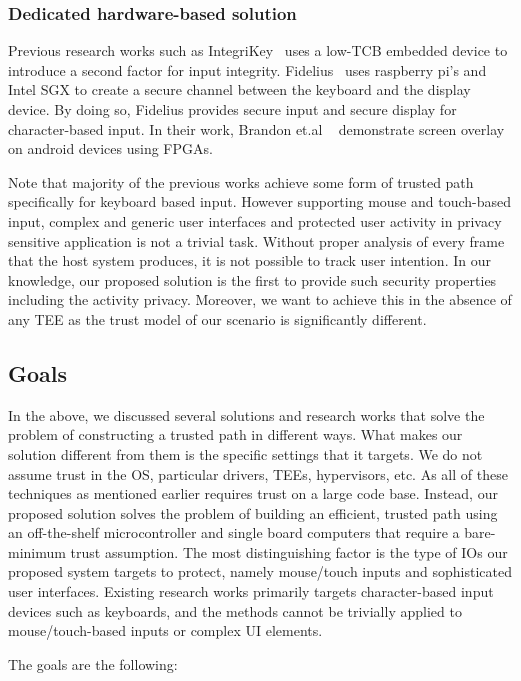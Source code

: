 \subsubsection{Dedicated hardware-based solution} Previous research works such as IntegriKey~\cite{IntegriKey} uses a low-TCB embedded device to introduce a second factor for input integrity. Fidelius~\cite{Fidelius} uses raspberry pi's and Intel SGX to create a secure channel between the keyboard and the display device. By doing so, Fidelius provides secure input and secure display for character-based input. In their work, Brandon et.al ~\cite{brandon2017trusted} demonstrate screen overlay on android devices using FPGAs.

Note that majority of the previous works achieve some form of trusted path specifically for keyboard based input. However supporting mouse and touch-based input, complex and generic user interfaces and protected user activity in privacy sensitive application is not a trivial task. Without proper analysis of every frame that the host system produces, it is not possible to track user intention. In our knowledge, our proposed solution is the first to provide such security properties including the activity privacy. Moreover, we want to achieve this in the absence of any TEE as the trust model of our scenario is significantly different. 


\subsection{Goals}

In the above, we discussed several solutions and research works that solve the problem of constructing a trusted path in different ways. What makes our solution different from them is the specific settings that it targets. We do not assume trust in the OS, particular drivers, TEEs, hypervisors, etc. As all of these techniques as mentioned earlier requires trust on a large code base. Instead, our proposed solution solves the problem of building an efficient, trusted path using an off-the-shelf microcontroller and single board computers that require a bare-minimum trust assumption. The most distinguishing factor is the type of IOs our proposed system targets to protect, namely mouse/touch inputs and sophisticated user interfaces. Existing research works primarily targets character-based input devices such as keyboards, and the methods cannot be trivially applied to mouse/touch-based inputs or complex UI elements. 

The goals are the following:

